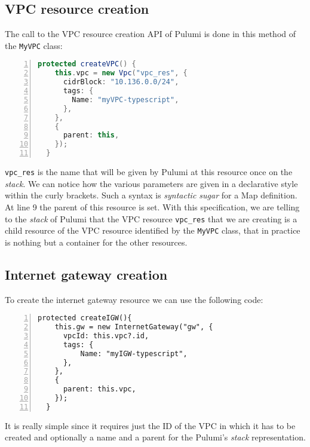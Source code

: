 \subsection{VPC resource creation}
The call to the VPC resource creation API of Pulumi is done in this method of the \texttt{MyVPC} class:\\
\begin{minipage}{\linewidth}
\begin{lstlisting}[language=scala, numbers=left, numberstyle=\tiny, numbersep=-5pt, stepnumber=1]
  protected createVPC() {
    this.vpc = new Vpc("vpc_res", {
      cidrBlock: "10.136.0.0/24",
      tags: {
        Name: "myVPC-typescript",
      },
    },
    {
      parent: this,
    });
  }
\end{lstlisting}
\end{minipage}
\texttt{vpc\_res} is the name that will be given by Pulumi at this resource once on the \textit{stack}.
We can notice how the various parameters are given in a declarative style within the curly brackets.
Such a syntax is \textit{syntactic sugar} for a Map definition.\\
At line 9 the parent of this resource is set.
With this specification, we are telling to the \textit{stack} of Pulumi that the VPC resource \texttt{vpc\_res} that we are creating is a child resource of the VPC resource identified by the \texttt{MyVPC} class, that in practice is nothing but a container for the other resources.

\subsection{Internet gateway creation}
To create the internet gateway resource we can use the following code:\\
\begin{minipage}{\linewidth}
\begin{lstlisting}[numbers=left, numberstyle=\tiny, numbersep=-5pt, stepnumber=1]
  protected createIGW(){
    this.gw = new InternetGateway("gw", {
      vpcId: this.vpc?.id,
      tags: {
          Name: "myIGW-typescript",
      },
    },
    {
      parent: this.vpc,
    });
  }
\end{lstlisting}
\end{minipage}
It is really simple since it requires just the ID of the VPC in which it has to be created and optionally a name and a parent for the Pulumi's \textit{stack} representation.


